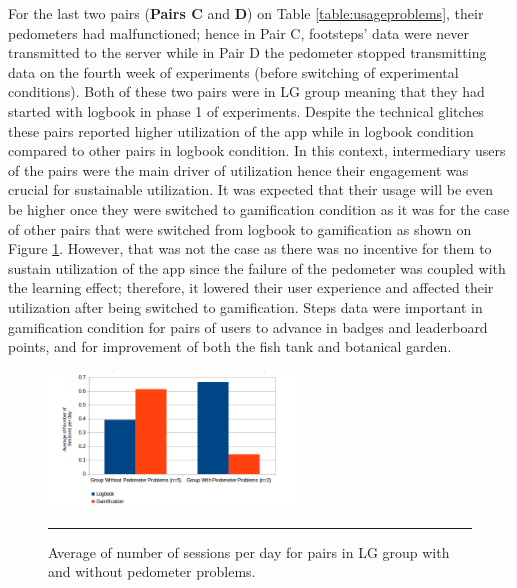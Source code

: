 For the last two pairs (\textbf{Pairs C} and \textbf{D}) on Table \ref{table:usageproblems}, their pedometers had malfunctioned; hence in Pair C, footsteps' data were never transmitted to the server while in Pair D the pedometer stopped transmitting data on the fourth week of experiments (before switching of experimental conditions). Both of these two pairs were in LG group meaning that they had started with logbook in phase 1 of experiments. Despite the technical glitches these pairs reported higher utilization of the app while in logbook condition compared to other pairs in logbook condition. In this context, intermediary users of the pairs were the main driver of utilization hence their engagement was crucial for sustainable utilization. It was expected that their usage will be even be higher once they were switched to gamification condition as it was for the case of other pairs that were switched from logbook to gamification as shown on Figure \ref{figure:lg_tech_prob_vs_w_o_tech_prob}. However, that was not the case as there was no incentive for them to sustain utilization of the app since the failure of the pedometer was coupled with the learning effect; therefore, it lowered their user experience and affected their utilization after being switched to gamification. Steps data were important in gamification condition for pairs of users to advance in badges and leaderboard points, and for improvement of both the fish tank and botanical garden.
 
\begin{figure}[htbp]
  \centering
    \includegraphics[width=0.6\textwidth]{Figures/compare_lg_problems_without_problems.png}
    \rule{35em}{0.5pt}
  \caption{Average of number of sessions per day for pairs in LG group with and without pedometer problems.}
  \label{figure:lg_tech_prob_vs_w_o_tech_prob}
\end{figure}

